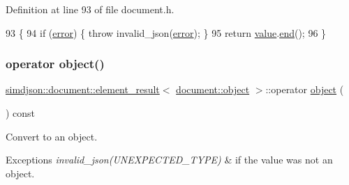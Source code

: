 Definition at line 93 of file document.\+h.


\begin{DoxyCode}
93                                                                                                 \{
94   \textcolor{keywordflow}{if} (\hyperlink{classsimdjson_1_1document_1_1element__result_3_01document_1_1object_01_4_afb94302f28fe94b4eee922f4803abf86}{error}) \{ \textcolor{keywordflow}{throw} invalid\_json(\hyperlink{classsimdjson_1_1document_1_1element__result_3_01document_1_1object_01_4_afb94302f28fe94b4eee922f4803abf86}{error}); \}
95   \textcolor{keywordflow}{return} \hyperlink{classsimdjson_1_1document_1_1element__result_3_01document_1_1object_01_4_a65174f23d014d2e7d6ed87f42b60045a}{value}.\hyperlink{classsimdjson_1_1document_1_1object_a38ab9979d9eecb0b70768dcde9d12864}{end}();
96 \}
\end{DoxyCode}
\mbox{\label{classsimdjson_1_1document_1_1element__result_3_01document_1_1object_01_4_a1860c0c14ebacd768bde403e0cc446d3}} 
\subsubsection{\texorpdfstring{operator object()}{operator object()}}
{\footnotesize\ttfamily \hyperlink{classsimdjson_1_1document_1_1element__result}{simdjson\+::document\+::element\+\_\+result}$<$ \hyperlink{classsimdjson_1_1document_1_1object}{document\+::object} $>$\+::operator \hyperlink{classsimdjson_1_1document_1_1object}{object} (\begin{DoxyParamCaption}{ }\end{DoxyParamCaption}) const\hspace{0.3cm}{\ttfamily [noexcept]}}



Convert to an object. 


\begin{DoxyExceptions}{Exceptions}
{\em invalid\+\_\+json(\+U\+N\+E\+X\+P\+E\+C\+T\+E\+D\+\_\+\+T\+Y\+P\+E)} & if the value was not an object. \\
\hline
\end{DoxyExceptions}
\mbox{\label{classsimdjson_1_1document_1_1element__result_3_01document_1_1object_01_4_a02f08a5cb7573c2293cbeddae4080032}} 
